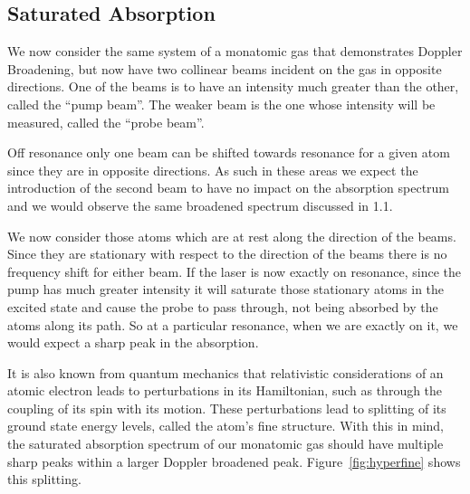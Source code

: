\documentclass[paper=a4, fontsize=11pt]{scrartcl} %
\numberwithin{equation}{section}
\numberwithin{figure}{section}
\numberwithin{table}{section}
\begin{document}
\subsection{Saturated Absorption}

We now consider the same system of a monatomic gas that demonstrates
Doppler Broadening, but now have two collinear beams incident on the
gas in opposite directions. One of the beams is to have an intensity
much greater than the other, called the ``pump beam''. The weaker beam
is the one whose intensity will be measured, called the ``probe
beam''.

Off resonance only one beam can be shifted towards resonance for a
given atom since they are in opposite directions. As such in these
areas we expect the introduction of the second beam to have no impact
on the absorption spectrum and we would observe the same broadened
spectrum discussed in 1.1. 

We now consider those atoms which are at rest along the direction of
the beams. Since they are stationary with respect to the direction of
the beams there is no frequency shift for either beam. If the laser is
now exactly on resonance, since the pump has much greater intensity it
will saturate those stationary atoms in the excited state and cause
the probe to pass through, not being absorbed by the atoms along its
path. So at a particular resonance, when we are exactly on it, we
would expect a sharp peak in the absorption. 

It is also known from quantum mechanics that relativistic
considerations of an atomic electron leads to perturbations in its
Hamiltonian, such as through the coupling of its spin with its
motion. These perturbations lead to splitting of its ground state
energy levels, called the atom's fine structure. With this in mind, the saturated absorption spectrum of
our monatomic gas should have multiple sharp peaks within a larger
Doppler broadened peak. Figure~\ref{fig:hyperfine} shows this splitting.
\end{document}
